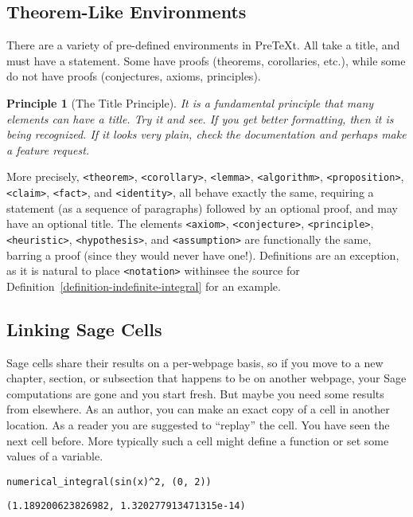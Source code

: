 \documentclass[10pt,]{article}
\theoremstyle{plain}
\newtheorem{principle}[theorem]{Principle}
\theoremstyle{definition}
\theoremstyle{definition}
\theoremstyle{definition}
\theoremstyle{definition}
\theoremstyle{definition}
\theoremstyle{definition}
\numberwithin{equation}{section}
\begin{document}
\subsection[{Theorem-Like Environments}]{Theorem-Like Environments}\label{subsection-3}
\hypertarget{p-119}{}%
There are a variety of pre-defined environments in PreTeXt.  All take a title, and must have a statement.  Some have proofs (theorems, corollaries, etc.\@), while some do not have proofs (conjectures, axioms, principles).%
\begin{principle}[{The Title Principle}]\label{principle-principle}
\hypertarget{p-120}{}%
It is a fundamental principle that many elements can have a title.  Try it and see. If you get better formatting, then it is being recognized.  If it looks very plain, check the documentation and perhaps make a feature request.%
\end{principle}
\hypertarget{p-121}{}%
More precisely, \lstinline?<theorem>?, \lstinline?<corollary>?, \lstinline?<lemma>?, \lstinline?<algorithm>?, \lstinline?<proposition>?, \lstinline?<claim>?, \lstinline?<fact>?, and \lstinline?<identity>?, all behave exactly the same, requiring a statement (as a sequence of paragraphs) followed by an optional proof, and may have an optional title.  The elements \lstinline?<axiom>?, \lstinline?<conjecture>?, \lstinline?<principle>?, \lstinline?<heuristic>?, \lstinline?<hypothesis>?, and \lstinline?<assumption>? are functionally the same, barring a proof (since they would never have one!).  Definitions are an exception, as it is natural to place \lstinline?<notation>? within\textemdash{}see the source for Definition~\hyperref[definition-indefinite-integral]{\ref{definition-indefinite-integral}} for an example.%
\typeout{************************************************}
\typeout{************************************************}
\subsection[{Linking Sage Cells}]{Linking Sage Cells}\label{subsection-4}
\hypertarget{p-122}{}%
Sage cells share their results on a per-webpage basis, so if you move to a new chapter, section, or subsection that happens to be on another webpage, your Sage computations are gone and you start fresh.  But maybe you need some results from elsewhere.  As an author, you can make an exact copy of a cell in another location.  As a reader you are suggested to ``replay'' the cell.  You have seen the next cell before.  More typically such a cell might define a function or set some values of a variable.%
\begin{lstlisting}[style=sageinput]
numerical_integral(sin(x)^2, (0, 2))
\end{lstlisting}
\begin{lstlisting}[style=sageoutput]
(1.189200623826982, 1.320277913471315e-14)
\end{lstlisting}
\typeout{************************************************}
\typeout{************************************************}
\end{document}
